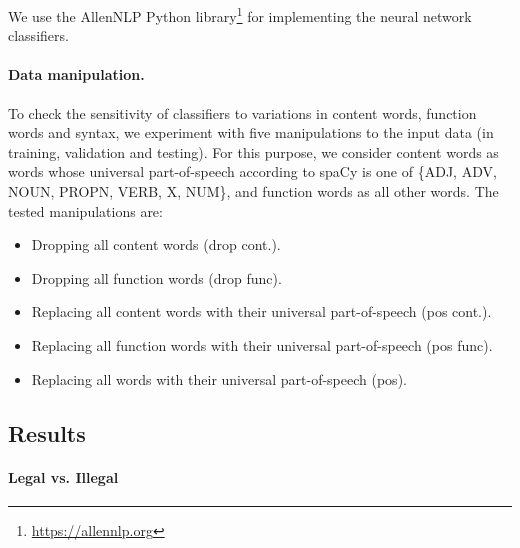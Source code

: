 \documentclass[11pt,a4paper,table]{article}
\begin{document}
We use the AllenNLP Python library\footnote{\url{https://allennlp.org}}
\cite{Gardner2017AllenNLP} for implementing the neural network classifiers.

\paragraph{Data manipulation.}

To check the sensitivity of classifiers to variations in content words,
function words and syntax, we experiment with five manipulations to the input
data (in training, validation and testing).
For this purpose, we consider content words as words whose universal part-of-speech
according to spaCy is one of \{ADJ, ADV, NOUN, PROPN, VERB, X, NUM\},
and function words as all other words.
The tested manipulations are:

\begin{itemize}
  \item Dropping all content words (drop cont.).
  \item Dropping all function words (drop func).
  \item Replacing all content words with their universal part-of-speech (pos cont.).
  \item Replacing all function words with their universal part-of-speech (pos func).
  \item Replacing all words with their universal part-of-speech (pos).
\end{itemize}

\subsection{Results}

\paragraph{Legal vs. Illegal}
\end{document}
